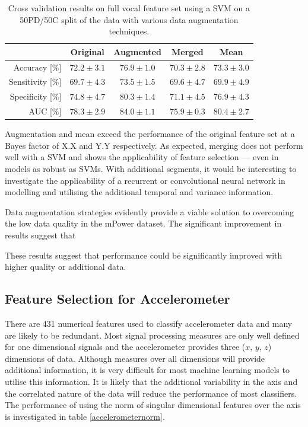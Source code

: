 \documentclass[12pt, twoside]{book}
\begin{document}
\begin{table}[h]
	\caption{Cross validation results on full vocal feature set using a SVM on a 50PD/50C split of the data with various data augmentation techniques.}
	\label{speechboost}
	\centering
	\begin{tabular}{@{}rcccc@{}}
		&  Original & Augmented & Merged & Mean \\ \midrule
		Accuracy [\%]    &      $72.2\pm3.1$ &                       $76.9\pm1.0$                                  &     		$70.3\pm2.8$
		&						$73.3\pm3.0$\\ \midrule
		Sensitivity [\%] &       $69.7\pm4.3$ &                       $73.5\pm1.5$                                  &    		$69.6\pm4.7$
		&					    $69.9\pm4.9$\\ \midrule
		Specificity [\%] &      $74.8\pm4.7$ &                       $80.3\pm1.4$                                  &    		$71.1\pm4.5$
		&					    $76.9\pm4.3$\\ \midrule
		AUC [\%]         &      $78.3\pm2.9$ &                       $84.0\pm1.1$                                  &     		$75.9\pm0.3$
		&				 		$80.4\pm2.7$\\ \midrule
	\end{tabular}
\end{table}

Augmentation and mean exceed the performance of the original feature set at a Bayes factor of X.X and Y.Y respectively. As expected, merging does not perform well with a SVM and shows the applicability of feature selection --- even in models as robust as SVMs. With additional segments, it would be interesting to investigate the applicability of a recurrent or convolutional neural network in modelling and utilising the additional temporal and variance information.

Data augmentation strategies evidently provide a viable solution to overcoming the low data quality in the mPower dataset. The significant improvement in results suggest that 

These results suggest that performance could be significantly improved with higher quality or additional data. 



\subsection{Feature Selection for Accelerometer}
There are 431 numerical features used to classify accelerometer data and many are likely to be redundant. Most signal processing measures are only well defined for one dimensional signals and the accelerometer provides three ($x$, $y$, $z$) dimensions of data. Although measures over all dimensions will provide additional information, it is very difficult for most machine learning models to utilise this information. It is likely that the additional variability in the axis and the correlated nature of the data will reduce the performance of most classifiers. The performance of using the norm of singular dimensional features over the axis is investigated in table \ref{accelerometernorm}.
\end{document}

